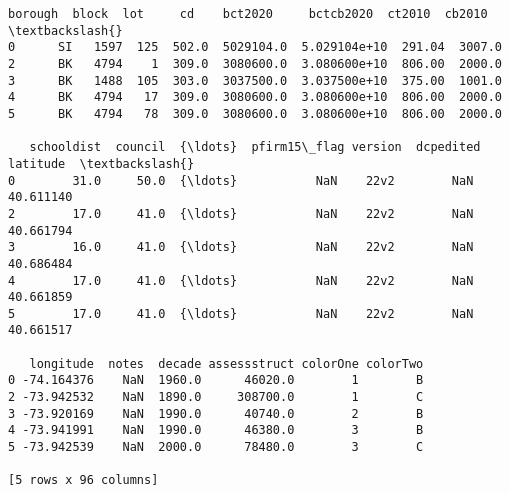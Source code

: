 \documentclass[11pt]{article}
\begin{document}
            \begin{tcolorbox}[breakable, size=fbox, boxrule=.5pt, pad at break*=1mm, opacityfill=0]
\begin{Verbatim}[commandchars=\\\{\}]
  borough  block  lot     cd    bct2020     bctcb2020  ct2010  cb2010  \textbackslash{}
0      SI   1597  125  502.0  5029104.0  5.029104e+10  291.04  3007.0
2      BK   4794    1  309.0  3080600.0  3.080600e+10  806.00  2000.0
3      BK   1488  105  303.0  3037500.0  3.037500e+10  375.00  1001.0
4      BK   4794   17  309.0  3080600.0  3.080600e+10  806.00  2000.0
5      BK   4794   78  309.0  3080600.0  3.080600e+10  806.00  2000.0

   schooldist  council  {\ldots}  pfirm15\_flag version  dcpedited   latitude  \textbackslash{}
0        31.0     50.0  {\ldots}           NaN    22v2        NaN  40.611140
2        17.0     41.0  {\ldots}           NaN    22v2        NaN  40.661794
3        16.0     41.0  {\ldots}           NaN    22v2        NaN  40.686484
4        17.0     41.0  {\ldots}           NaN    22v2        NaN  40.661859
5        17.0     41.0  {\ldots}           NaN    22v2        NaN  40.661517

   longitude  notes  decade assessstruct colorOne colorTwo
0 -74.164376    NaN  1960.0      46020.0        1        B
2 -73.942532    NaN  1890.0     308700.0        1        C
3 -73.920169    NaN  1990.0      40740.0        2        B
4 -73.941991    NaN  1990.0      46380.0        3        B
5 -73.942539    NaN  2000.0      78480.0        3        C

[5 rows x 96 columns]
\end{Verbatim}
\end{tcolorbox}
        
\end{document}

